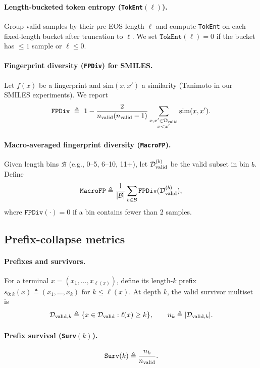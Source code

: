 \documentclass{article}
\theoremstyle{plain}
\theoremstyle{definition}
\theoremstyle{remark}
\begin{document}
\paragraph{Length-bucketed token entropy (\texttt{TokEnt}$(\ell)$).}
Group valid samples by their pre-EOS length $\ell$ and compute \texttt{TokEnt} on each fixed-length bucket after truncation to $\ell$.
We set $\texttt{TokEnt}(\ell)=0$ if the bucket has $\le 1$ sample or $\ell\le 0$.

\paragraph{Fingerprint diversity (\texttt{FPDiv}) for SMILES.}
Let $f(x)$ be a fingerprint and $\mathrm{sim}(x,x')$ a similarity (Tanimoto in our SMILES experiments).
We report
\begin{equation}
\texttt{FPDiv}\ \triangleq\ 1-\frac{2}{n_{\valid}(n_{\valid}-1)}\sum_{\substack{x,x'\in\mathcal{D}_{\valid}\\ x<x'}} \mathrm{sim}(x,x').
\end{equation}

\paragraph{Macro-averaged fingerprint diversity (\texttt{MacroFP}).}
Given length bins $\mathcal{B}$ (e.g., 0--5, 6--10, 11+), let $\mathcal{D}_{\mathrm{valid}}^{(b)}$ be the valid subset in bin $b$.
Define
\[
\texttt{MacroFP}\triangleq \frac{1}{|\mathcal{B}|}\sum_{b\in\mathcal{B}} \texttt{FPDiv}(\mathcal{D}_{\mathrm{valid}}^{(b)}),
\]
where $\texttt{FPDiv}(\cdot)=0$ if a bin contains fewer than 2 samples.


\subsection{Prefix-collapse metrics}
\label{app:metrics_prefix}

\paragraph{Prefixes and survivors.}
For a terminal $x=(x_1,\dots,x_{\ell(x)})$, define its length-$k$ prefix
$s_{0:k}(x)\triangleq(x_1,\dots,x_k)$ for $k\le \ell(x)$.
At depth $k$, the valid survivor multiset is
\[
\mathcal{D}_{\mathrm{valid},k}\triangleq\{x\in\mathcal{D}_{\mathrm{valid}}:\ell(x)\ge k\},\qquad n_k\triangleq|\mathcal{D}_{\mathrm{valid},k}|.
\]

\paragraph{Prefix survival (\texttt{Surv}$(k)$).}
\[
\texttt{Surv}(k)\triangleq \frac{n_k}{n_{\mathrm{valid}}}.
\]
\end{document}
